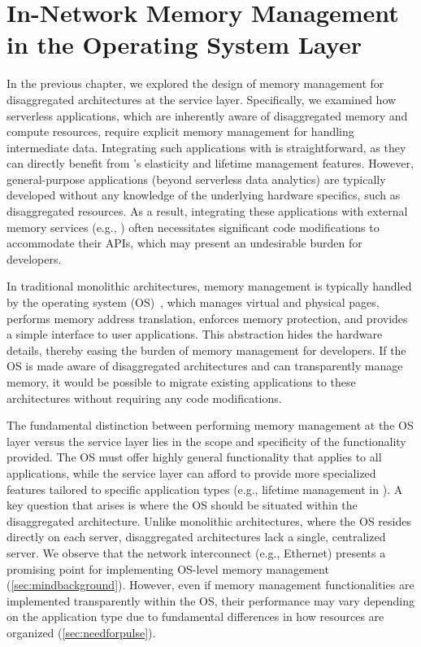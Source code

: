 \chapter{In-Network Memory Management in the Operating System Layer}
\label{chap:os}
In the previous chapter, we explored the design of memory management for disaggregated architectures at the service layer. Specifically, we examined how serverless applications, which are inherently aware of disaggregated memory and compute resources, require explicit memory management for handling intermediate data. Integrating such applications with \jiffy is straightforward, as they can directly benefit from \jiffy's elasticity and lifetime management features. However, general-purpose applications (beyond serverless data analytics) are typically developed without any knowledge of the underlying hardware specifics, such as disaggregated resources. As a result, integrating these applications with external memory services (e.g., \jiffy) often necessitates significant code modifications to accommodate their APIs, which may present an undesirable burden for developers.

In traditional monolithic architectures, memory management is typically handled by the operating system (OS)~\cite{memorymanagementsurvey1,memorymanagementsurvey2,memorymanagementsurvey3,memorymanagementsurvey4}, which manages virtual and physical pages, performs memory address translation, enforces memory protection, and provides a simple interface to user applications. This abstraction hides the hardware details, thereby easing the burden of memory management for developers. If the OS is made aware of disaggregated architectures and can transparently manage memory, it would be possible to migrate existing applications to these architectures without requiring any code modifications. 

The fundamental distinction between performing memory management at the OS layer versus the service layer lies in the scope and specificity of the functionality provided. The OS must offer highly general functionality that applies to all applications, while the service layer can afford to provide more specialized features tailored to specific application types (e.g., lifetime management in \jiffy). A key question that arises is where the OS should be situated within the disaggregated architecture. Unlike monolithic architectures, where the OS resides directly on each server, disaggregated architectures lack a single, centralized server. We observe that the network interconnect (e.g., Ethernet) presents a promising point for implementing OS-level memory management (\ref{sec:mindbackground}). However, even if memory management functionalities are implemented transparently within the OS, their performance may vary depending on the application type due to fundamental differences in how resources are organized (\ref{sec:needforpulse}).

